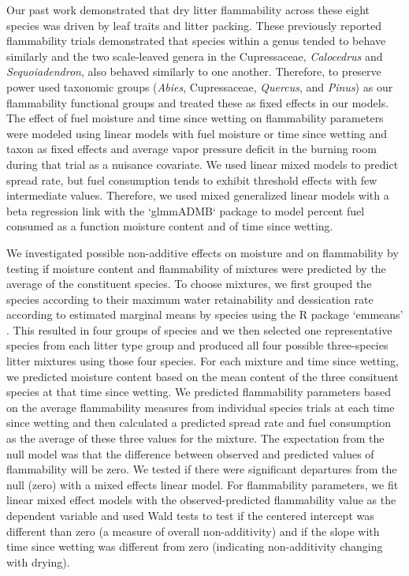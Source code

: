 \documentclass[fire,article,submit,moreauthors,pdftex]{Definitions/mdpi}
\begin{document}
Our past work \cite{Magalhaes+Schwilk-2012} demonstrated that dry litter
flammability across these eight species was driven by leaf traits and litter
packing. These previously reported flammability trials demonstrated that species within a genus tended to behave similarly and the two scale-leaved genera in the Cupressaceae,
\emph{Calocedrus} and \emph{Sequoiadendron}, also behaved similarly to one
another. Therefore, to preserve power used taxonomic groups (\emph{Abies}, Cupressaceae, \emph{Quercus}, and \emph{Pinus}) as our flammability functional groups and treated these as fixed effects in our models. The effect of fuel moisture and
time since wetting on flammability parameters were modeled using linear
models with fuel moisture or time since wetting and taxon as fixed effects and
average vapor pressure deficit in the burning room during that trial as a
nuisance covariate. We used linear mixed models to predict spread rate, but
fuel consumption tends to exhibit threshold effects with few intermediate
values. Therefore, we used mixed generalized linear models with a beta
regression link with the `glmmADMB` package \cite{Skaug_Fournier_etal-2016} to
model percent fuel consumed as a function moisture content and of time since
wetting.

We investigated possible non-additive effects on moisture and on flammability
by testing if moisture content and flammability of mixtures were predicted by
the average of the constituent species. To choose mixtures, we first grouped
the species according to their maximum water retainability and dessication rate
according to estimated marginal means by species using the R package `emmeans'
\cite{Lenth-2019}. This resulted in four groups of species and we then selected
one representative species from each litter type group and produced all four
possible three-species litter mixtures using those four species. For each
mixture and time since wetting, we predicted moisture content based on the mean
content of the three consituent species at that time since wetting. We
predicted flammability parameters based on the average flammability measures
from individual species trials at each time since wetting and then calculated a
predicted spread rate and fuel consumption as the average of these three values
for the mixture. The expectation from the null model was that the difference
between observed and predicted values of flammability will be zero. We tested
if there were significant departures from the null (zero) with a mixed effects
linear model. For flammability parameters, we fit linear mixed effect models
with the observed-predicted flammability value as the dependent variable and
used Wald tests to test if the centered intercept was different than zero (a
measure of overall non-additivity) and if the slope with time since wetting was
different from zero (indicating non-additivity changing with drying).
\end{document}
